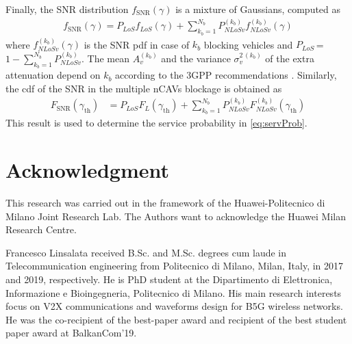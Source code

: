 \documentclass[journal]{IEEEtran}
\begin{document}
Finally, the SNR distribution $f_{\mathrm{{SNR}}}({\gamma})$ is a mixture of Gaussians, computed as
\begin{align} \label{eq:f_snr_multiple}
    f_{\text{SNR}}(\gamma) = P_{LoS}  f_{LoS}(\gamma) + \sum_{k_b = 1}^{ N_{b}} P_{NLoSv}^{(k_b)}   f_{NLoSv}^{(k_b)}(\gamma)
\end{align}
where $f_{NLoSv}^{(k_b)}(\gamma)$ is the SNR pdf in case of $k_b$ blocking vehicles and $P_{LoS}$\,=\,$1 - \sum_{k_b = 1}^{ N_{b}} P_{NLoSv}^{(k_b)}$. The mean $A^{(k_b)}_{v}$ and the variance $\sigma^{2\,(k_b)}_{v}$ of the extra attenuation depend on $k_b$ according to the 3GPP recommendations \cite{14rel}.
Similarly, the cdf of the SNR in the multiple nCAVs blockage is obtained as
\begin{align} \label{eq:F_snr_multiple}
    F_{\text{SNR}}(\gamma_{\text{th}})&= P_{{LoS}}   F_{{ L}}(\gamma_{\text{th}}) + \sum_{k_b = 1}^{ N_{b}} P_{{NLoSv}}^{(k_b)} F_{{NLoSv}}^{(k_b)}(\gamma_{\text{th}})
\end{align}
This result is used to determine the service probability in \eqref{eq:servProb}.


\section*{Acknowledgment}

This research was carried out in the framework of the Huawei-Politecnico di Milano Joint Research Lab. The Authors want to acknowledge the Huawei Milan Research Centre.


\ifCLASSOPTIONcaptionsoff
  \newpage
\fi






\newpage
\begin{IEEEbiography}{Francesco Linsalata} received B.Sc. and M.Sc. degrees cum laude in Telecommunication engineering from Politecnico di Milano, Milan, Italy, in 2017 and 2019, respectively. He is PhD student at the Dipartimento di Elettronica, Informazione e Bioingegneria, Politecnico di Milano.  His main research interests focus on V2X communications and waveforms design for B5G wireless networks. He was the co-recipient of the best-paper award and recipient of the best student paper award at BalkanCom'19. 
\end{IEEEbiography}
\end{document}
